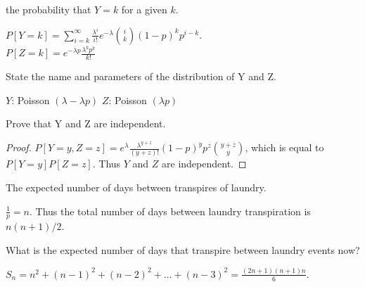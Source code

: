 \documentclass[11pt]{article}
\begin{document}
\newpage
{}

\begin{Parts}
    
    \Part the probability that $Y = k$ for a given $k$. 

    \begin{Answer}
        $P[Y = k] = \sum_{i = k}^{\infty} \frac{\lambda^i}{i!} e^{-\lambda}{i \choose k}(1 - p)^k p^{i - k}$.  \\
        $P[Z = k] = e^{-\lambda p}\frac{\lambda^kp^k}{k!}$
    \end{Answer}

    \Part State the name and parameters of the distribution of Y and Z.

    \begin{Answer}
        $Y$: Poisson $(\lambda - \lambda p)$
        $Z$: Poisson $(\lambda p)$
    \end{Answer}

    \Part Prove that Y and Z are independent.

    \begin{Answer}
        \begin{proof}
            $P[Y = y, Z = z] = e^{\lambda} \frac{\lambda^{y + z}}{(y + z)!}(1 - p)^yp^z{y + z \choose y}$, which 
            is equal to $P[Y = y]P[Z = z]$. Thus $Y$ and $Z$ are independent. 
        \end{proof}
    \end{Answer}

\end{Parts}

\newpage
{}

\begin{Parts}

    \Part The expected number of days between transpires of laundry. 

    \begin{Answer}
        $\frac{1}{p} = n$. Thus the total number of days between laundry transpiration is $n(n + 1) / 2$. 
    \end{Answer}

    \Part What is the expected number of days that transpire between laundry events now?

    \begin{Answer}
        $S_n = n^2 + (n - 1)^2 + (n - 2)^2 + \ldots + (n - 3)^2 = \frac{(2n + 1)(n + 1)n}{6}$. 
    \end{Answer}

\end{Parts}
\end{document}
